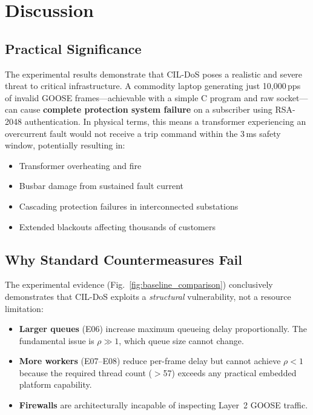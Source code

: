 \documentclass[journal]{IEEEtran}
\begin{document}
\section{Discussion}

\subsection{Practical Significance}
The experimental results demonstrate that CIL-DoS poses a realistic and severe threat to critical infrastructure. A commodity laptop generating just 10,000\,pps of invalid GOOSE frames---achievable with a simple C program and raw socket---can cause \textbf{complete protection system failure} on a subscriber using RSA-2048 authentication. In physical terms, this means a transformer experiencing an overcurrent fault would not receive a trip command within the 3\,ms safety window, potentially resulting in:
\begin{itemize}[leftmargin=*]
    \item Transformer overheating and fire
    \item Busbar damage from sustained fault current
    \item Cascading protection failures in interconnected substations
    \item Extended blackouts affecting thousands of customers
\end{itemize}

\subsection{Why Standard Countermeasures Fail}
The experimental evidence (Fig.~\ref{fig:baseline_comparison}) conclusively demonstrates that CIL-DoS exploits a \emph{structural} vulnerability, not a resource limitation:
\begin{itemize}[leftmargin=*]
    \item \textbf{Larger queues} (E06) increase maximum queueing delay proportionally. The fundamental issue is $\rho \gg 1$, which queue size cannot change.
    \item \textbf{More workers} (E07--E08) reduce per-frame delay but cannot achieve $\rho < 1$ because the required thread count ($>$57) exceeds any practical embedded platform capability.
    \item \textbf{Firewalls} are architecturally incapable of inspecting Layer~2 GOOSE traffic.
\end{itemize}
\end{document}
